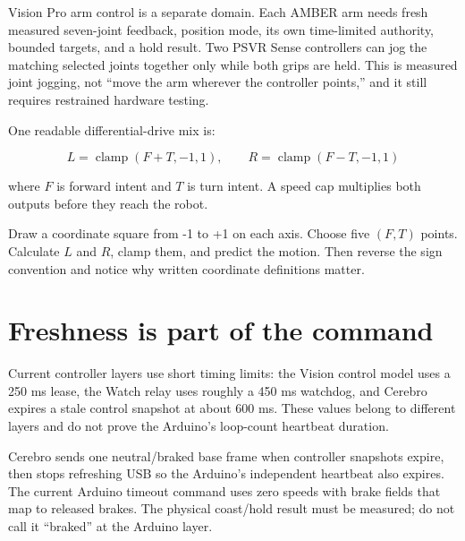 \documentclass[11pt,openany]{book}
\begin{document}
Vision Pro arm control is a separate domain. Each AMBER arm needs fresh measured seven-joint feedback, position mode, its own time-limited authority, bounded targets, and a hold result. Two PSVR Sense controllers can jog the matching selected joints together only while both grips are held. This is measured joint jogging, not ``move the arm wherever the controller points,'' and it still requires restrained hardware testing.

One readable differential-drive mix is:

\[
L = \operatorname{clamp}(F + T,-1,1), \qquad
R = \operatorname{clamp}(F - T,-1,1)
\]

where $F$ is forward intent and $T$ is turn intent. A speed cap multiplies both outputs before they reach the robot.

\begin{buildbox}[title={JOYSTICK GRAPH}]
Draw a coordinate square from -1 to +1 on each axis. Choose five $(F,T)$ points. Calculate $L$ and $R$, clamp them, and predict the motion. Then reverse the sign convention and notice why written coordinate definitions matter.
\end{buildbox}

\section*{Freshness is part of the command}

Current controller layers use short timing limits: the Vision control model uses a 250 ms lease, the Watch relay uses roughly a 450 ms watchdog, and Cerebro expires a stale control snapshot at about 600 ms. These values belong to different layers and do not prove the Arduino's loop-count heartbeat duration.

\ROBStopChainDiagram

\begin{fieldnotebox}
Cerebro sends one neutral/braked base frame when controller snapshots expire, then stops refreshing USB so the Arduino's independent heartbeat also expires. The current Arduino timeout command uses zero speeds with brake fields that map to released brakes. The physical coast/hold result must be measured; do not call it ``braked'' at the Arduino layer.
\end{fieldnotebox}

\end{document}
